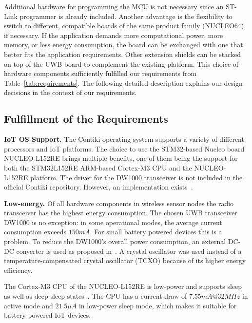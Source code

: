 \documentclass[journal,comsoc]{IEEEtran}
\begin{document}
Additional hardware for programming the MCU is not necessary since an ST-Link programmer is already included. 
Another advantage is the flexibility to switch to different, compatible boards of the same product family (NUCLEO64), if necessary. 
If the application demands more computational power, more memory, or less energy consumption, the board can be exchanged with one that better fits the application requirements. 
Other extension shields can be stacked on top of the UWB board to complement the existing platform. 
This choice of hardware components sufficiently fulfilled our requirements from Table~\ref{tab:requirements}. 
The following detailed description explains our design decisions in the context of our requirements. 

\subsection{Fulfillment of the Requirements}
\label{subsec:implementingrequirements}

\vspace*{0.5em}
\noindent\textbf{IoT OS Support.} The Contiki operating system supports a variety of different processors and IoT platforms. 
The choice to use the STM32-based Nucleo board NUCLEO-L152RE brings multiple benefits, one of them being the support for both the STM32L152RE ARM-based Cortex-M3 CPU and the NUCLEO-L152RE platform. 
The driver for the DW1000 transceiver is not included in the official Contiki repository. 
However, an implementation exists~\cite{contikidw1000driver}. 

\vspace*{0.5em}
\noindent\textbf{Low-energy.} Of all hardware components in wireless sensor nodes the radio transceiver has the highest energy consumption. 
The chosen UWB transceiver DW1000 is no exception: in some operational modes, the average current consumption exceeds $150mA$. 
For small battery powered devices this is a problem. 
To reduce the DW1000's overall power consumption, an external DC-DC converter is used as proposed in~\cite[section 7.2]{dw1000ds}.
A crystal oscillator was used instead of a temperature-compensated crystal oscillator (TCXO) because of its higher energy efficiency. 

The Cortex-M3 CPU of the NUCLEO-L152RE is low-power and supports sleep as well as deep-sleep states~\cite{stm32ds}. 
The CPU has a current draw of $7.55mA@32MHz$ in active mode and $21.5\mu A$ in low-power sleep mode, which makes it suitable for battery-powered IoT devices. 
\end{document}
